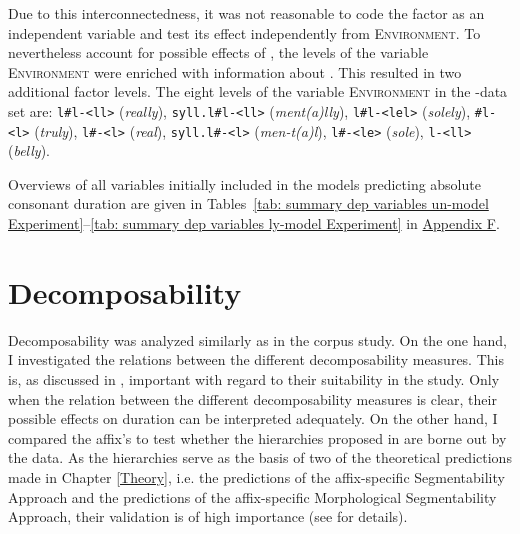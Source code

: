  Due to this interconnectedness, it was not reasonable to code the factor  as an independent variable and test its effect independently from \textsc{Environment}. 
 To nevertheless account for possible effects of , the levels of the variable \textsc{Environment} were enriched with information about . 
This resulted in two additional factor levels.
   The eight levels of the variable \textsc{Environment} in the -data set are: \texttt{l\#l-<ll>} (\textit{really}), \texttt{syll.l\#l-<ll>} (\textit{ment(a)lly}), \texttt{l\#l-<lel>} (\textit{solely}), \texttt{\#l-<l>} (\textit{truly}), \texttt{l\#-<l>} (\textit{real}), \texttt{syll.l\#-<l>} (\textit{men-t(a)l}),  \texttt{l\#-<le>} (\textit{sole}), \texttt{l-<ll> }(\textit{belly}). 		

Overviews of all variables initially included in the models predicting absolute consonant duration are given in Tables~\ref{tab: summary dep variables un-model Experiment}--\ref{tab: summary dep variables ly-model Experiment} in \hyperref[Appendix F Summaries of variables in initial models of experimental study]{Appendix F}.



\section{Decomposability} \label{decomposability experiment}


 

Decomposability was analyzed similarly as in the corpus study. On the one hand, I investigated the relations between the different decomposability measures. This is, as discussed in , important with regard to their suitability in the study. Only when the relation between the different decomposability measures is clear, their possible effects on duration can be interpreted adequately.  
On the other hand, I compared the affix's  to test whether the  hierarchies proposed in  are borne out by the data.  As the hierarchies serve as the basis of two of the theoretical predictions made in Chapter \ref{Theory}, i.e. the predictions of the affix-specific Segmentability Approach and the predictions of the affix-specific Morphological Segmentability Approach, their validation is of high importance (see  for details). 




